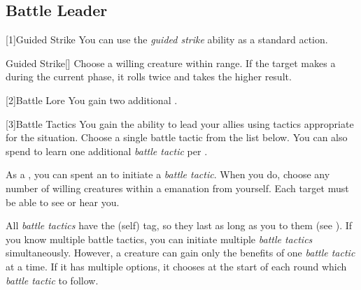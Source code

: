     \subsection{Battle Leader}

        [1]{Guided Strike} You can use the \textit{guided strike} ability as a standard action.
        \begin{freeability}{Guided Strike}[]
            Choose a willing creature within \rngclose range.
            If the target makes a  during the current phase, it rolls twice and takes the higher result.
        \end{freeability}

        [2]{Battle Lore} You gain two additional . 

        [3]{Battle Tactics}
        You gain the ability to lead your allies using tactics appropriate for the situation.
        Choose a single battle tactic from the list below.
        You can also spend  to learn one additional \textit{battle tactic} per .

        As a , you can spent an  to initiate a \textit{battle tactic}.
        When you do, choose any number of willing creatures within a \arealarge emanation from yourself.
        Each target must be able to see or hear you.

        All \textit{battle tactics} have the  (self) tag, so they last as long as you  to them (see ).
        If you know multiple battle tactics, you can initiate multiple \textit{battle tactics} simultaneously.
        However, a creature can gain only the benefits of one \textit{battle tactic} at a time.
        If it has multiple options, it chooses at the start of each round which \textit{battle tactic} to follow.

